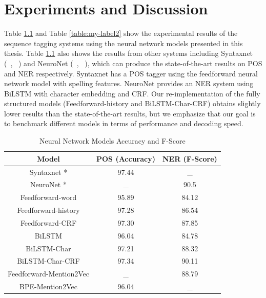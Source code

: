 \documentclass{sfuthesis}
\begin{document}
\chapter{Experiments and Discussion}

Table \ref{table:my-label1} and Table \ref{table:my-label2} show the experimental results of the sequence tagging systems using the neural network models presented in this thesis. Table \ref{table:my-label1} also shows the results from other systems including Syntaxnet (~\citeauthor{alberti2017syntaxnet}, ~\citeyear{alberti2017syntaxnet}) and NeuroNet (~\citeauthor{2017neuroner}, ~\citeyear{2017neuroner}), which can produce the state-of-the-art results on POS and NER respectively. Syntaxnet has a POS tagger using the feedforward neural network model with spelling features. NeuroNet provides an NER system using BiLSTM with character embedding and CRF. Our re-implementation of the fully structured models (Feedforward-history and BiLSTM-Char-CRF) obtains slightly lower results than the state-of-the-art results, but we emphasize that our goal is to benchmark different models in terms of performance and decoding speed.

\begin{table}[]
\centering
\caption{Neural Network Models Accuracy and F-Score}
\label{table:my-label1}
\begin{tabular}{|c|c|c|}
\hline
Model         & POS (Accuracy)  & NER (F-Score)       \\ \hline
Syntaxnet \**    & 97.44         &   _     \\ \hline
NeuroNet \**    & _    & 90.5                \\ \hline 
Feedforward-word    & 95.89          &   84.12     \\ \hline
Feedforward-history & 97.28     & 86.54        \\ \hline
Feedforward-CRF     & 97.30          &   87.85     \\ \hline
BiLSTM  & 96.04     & 84.78                             \\ \hline
BiLSTM-Char & 97.21 & 88.32             \\ \hline
BiLSTM-Char-CRF & 97.34  & 90.11             \\ \hline
Feedforward-Mention2Vec  & _    & 88.79                       \\ \hline
BPE-Mention2Vec & 96.04     &  _   \\ \hline   
\end{tabular}
\end{table}
\end{document}
